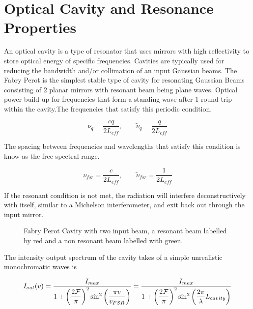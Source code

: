 \documentclass[a4paper]{book}
\newcommand{\imginput}[1]{} %
\begin{document}
	\section{Optical Cavity and Resonance Properties}
		\label{sec:Optical Cavity and Resonance Properties}
		An optical cavity is a type of resonator that uses mirrors with high reflectivity to store optical energy of specific frequencies. Cavities are typically used for reducing the bandwidth and/or collimation of an input Gaussian beams. The Fabry Perot is the simplest stable type of cavity for resonating Gaussian Beams consisting of 2 planar mirrors with resonant beam being plane waves. Optical power build up for frequencies that form a standing wave after 1 round trip within the cavity.The frequencies that satisfy this periodic condition. 
		
		\begin{equation}\label{eq:resonantfreq}
			\nu_q=\dfrac{cq}{2L_{eff}}, \qquad \tilde{\nu}_q=\dfrac{q}{2L_{eff}}
		\end{equation}
		
		The spacing between frequencies and wavelengths that satisfy this condition is know as the free spectral range.
		
		\begin{equation}\label{eq:FSR}
			\nu_{fsr}=\dfrac{c}{2L_{eff}}, \qquad \tilde{\nu}_{fsr}=\dfrac{1}{2L_{eff}}
		\end{equation}	
		
		If the resonant condition is not met, the radiation will interfere deconstructively with itself, similar to a Michelson interferometer, and exit back out through the input mirror.			
		
		\begin{figure} 
			\centering
			\def\svgwidth{\columnwidth}
			\resizebox{160mm}{!}{\imginput{images/feb-per-cav.pdf_tex}}
			\caption{Fabry Perot Cavity with two input beam, a resonant beam labelled by red and a non resonant beam labelled with green.}
			\label{fig:feb-per-cav}
		\end{figure}
		
		The intensity output spectrum of the cavity takes of a simple unrealistic monochromatic waves is
		
		\begin{equation} \label{eq:res}
			\centering
			{I_{out} (v)}=\dfrac{I_{max}}{1+\bigg(\dfrac{2\mathcal{F}}{\pi}\bigg)^2 \sin^2\bigg({\dfrac{\pi v}{v_{FSR}}}\bigg)}=\dfrac{I_{max}}{1+\left(\dfrac{2\mathcal{F}}{\pi}\right)^2 \sin^2\left({ \dfrac{2\pi}{\lambda}} L_{cavity}\right)}
		\end{equation}
		
\end{document}
